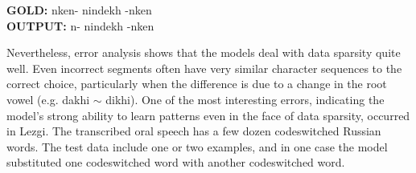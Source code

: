 \pex   
\label{ex:alaserrors}
\a \textbf{GOLD:} \hspace{2mm} n\textlangle{}\textrangle{}ken- \hspace{1mm} nindekh \hspace{1mm} -n\textlangle{}\textrangle{}ken \\
\textbf{OUTPUT:} \hspace{2mm} n- \hspace{5mm} nindekh \hspace{2mm} -n\textlangle{}\textrangle{}ken
\xe



Nevertheless, error analysis shows that the models deal with data sparsity quite well. Even incorrect segments often have very similar character sequences to the correct choice, particularly when the difference is due to a change in the root vowel (e.g. dakhi $\sim$ dikhi). One of the most interesting errors, indicating the model's strong ability to learn patterns even in the face of data sparsity, occurred in Lezgi. The transcribed oral speech has a few dozen codeswitched Russian words. The test data include one or two examples, and in one case the model substituted one codeswitched word with another codeswitched word. 

